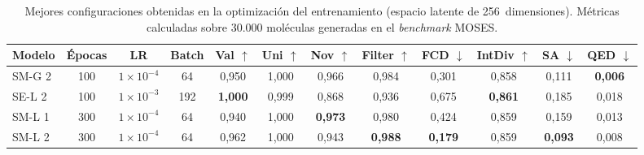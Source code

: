 \begin{table}[htbp]
\centering
\caption{Mejores configuraciones obtenidas en la optimización del entrenamiento (espacio latente de 256~dimensiones). Métricas calculadas sobre 30.000 moléculas generadas en el \textit{benchmark} MOSES.}
\label{tab:mejores_fase2}
\begin{tabular}{lccccccccccc}
\toprule
Modelo & Épocas & LR & Batch & Val $\uparrow$ & Uni $\uparrow$ & Nov $\uparrow$ & Filter $\uparrow$ & FCD $\downarrow$ & IntDiv $\uparrow$ & SA $\downarrow$ & QED $\downarrow$ \\
\midrule
SM-G 2 & 100 & $1 \times 10^{-4}$ & 64  & 0,950 & 1,000 & 0,966 & 0,984 & 0,301 & 0,858 & 0,111 & \textbf{0,006} \\
SE-L 2 & 100 & $1 \times 10^{-3}$ & 192 & \textbf{1,000} & 0,999 & 0,868 & 0,936 & 0,675 & \textbf{0,861} & 0,185 & 0,018 \\
SM-L 1 & 300 & $1 \times 10^{-4}$ & 64  & 0,940 & 1,000 & \textbf{0,973} & 0,980 & 0,424 & 0,859 & 0,159 & 0,013 \\
SM-L 2 & 300 & $1 \times 10^{-4}$ & 64  & 0,962 & 1,000 & 0,943 & \textbf{0,988} & \textbf{0,179} & 0,859 & \textbf{0,093} & 0,008 \\
\bottomrule
\end{tabular}
\end{table}
